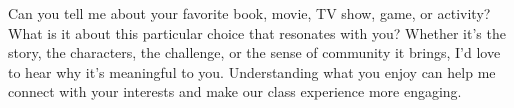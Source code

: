 \documentclass{ximera}
\author{Bart Snapp}
\begin{document}
\begin{question}
    Can you tell me about your favorite book, movie, TV show, game, or activity?
    What is it about this particular choice that resonates with you? Whether it's
    the story, the characters, the challenge, or the sense of community it brings,
    I'd love to hear why it's meaningful to you. Understanding what you enjoy can
    help me connect with your interests and make our class experience more
    engaging.
    \begin{freeResponse}
    \end{freeResponse}
\end{question}
\end{document}
